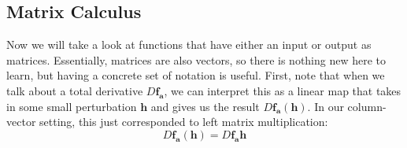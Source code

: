 \subsection{Matrix Calculus}

  Now we will take a look at functions that have either an input or output as matrices. Essentially, matrices are also vectors, so there is nothing new here to learn, but having a concrete set of notation is useful. First, note that when we talk about a total derivative $D \mathbf{f}_\mathbf{a}$, we can interpret this as a linear map that takes in some small perturbation $\mathbf{h}$ and gives us the result $D \mathbf{f}_\mathbf{a} (\mathbf{h})$. In our column-vector setting, this just corresponded to left matrix multiplication: 
  \begin{equation}
    D \mathbf{f}_\mathbf{a} (\mathbf{h}) = D \mathbf{f}_\mathbf{a} \mathbf{h}
  \end{equation}

